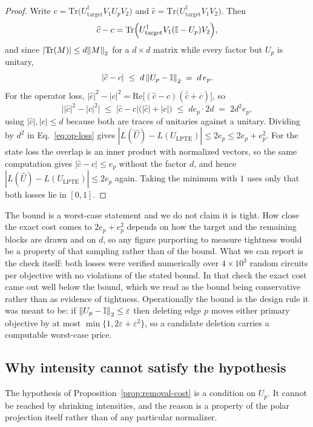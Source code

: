 \documentclass[twocolumn,aps,prl,superscriptaddress,showkeys]{revtex4-2}
\theoremstyle{plain}
\theoremstyle{definition}
\begin{document}
\begin{proof}
Write $c=\mathrm{Tr}\bigl(U_{\mathrm{target}}^\dagger V_1U_pV_2\bigr)$ and $\widehat c=\mathrm{Tr}\bigl(U_{\mathrm{target}}^\dagger V_1V_2\bigr)$. Then
$$\widehat c-c=\mathrm{Tr}\Bigl(U_{\mathrm{target}}^\dagger V_1(\mathbb{I}-U_p)V_2\Bigr),$$
and since $|\mathrm{Tr}(M)|\le d\norm{M}_2$ for a $d\times d$ matrix while every factor but $U_p$ is unitary,
$$|\widehat c-c|\;\le\;d\,\norm{U_p-\mathbb{I}}_2\;=\;d\,e_p .$$
For the operator loss, $|\widehat c|^2-|c|^2=\mathrm{Re}\bigl[(\widehat c-c)(\overline{\widehat c}+\overline c)\bigr]$, so
$$\bigl||\widehat c|^2-|c|^2\bigr|\;\le\;|\widehat c-c|\bigl(|\widehat c|+|c|\bigr)\;\le\;d e_p\cdot 2d\;=\;2d^2e_p ,$$
using $|\widehat c|,|c|\le d$ because both are traces of unitaries against a unitary. Dividing by $d^2$ in Eq.~\eqref{eq:op-loss} gives $|L(\widehat U)-L(U_{\mathrm{LPTE}})|\le 2e_p\le 2e_p+e_p^2$. For the state loss the overlap is an inner product with normalized vectors, so the same computation gives $|\widehat c-c|\le e_p$ without the factor $d$, and hence $|L(\widehat U)-L(U_{\mathrm{LPTE}})|\le 2e_p$ again. Taking the minimum with $1$ uses only that both losses lie in $[0,1]$.
\end{proof}

The bound is a worst-case statement and we do not claim it is tight. How close the exact cost comes to $2e_p+e_p^2$ depends on how the target and the remaining blocks are drawn and on $d$, so any figure purporting to measure tightness would be a property of that sampling rather than of the bound. What we can report is the check itself: both losses were verified numerically over $4\times10^3$ random circuits per objective with no violations of the stated bound. In that check the exact cost came out well below the bound, which we read as the bound being conservative rather than as evidence of tightness. Operationally the bound is the design rule it was meant to be: if $\norm{U_p-\mathbb{I}}_2\le\varepsilon$ then deleting edge $p$ moves either primary objective by at most $\min\{1,2\varepsilon+\varepsilon^2\}$, so a candidate deletion carries a computable worst-case price.

\subsection{Why intensity cannot satisfy the hypothesis}

The hypothesis of Proposition~\ref{prop:removal-cost} is a condition on $U_p$. It cannot be reached by shrinking intensities, and the reason is a property of the polar projection itself rather than of any particular normalizer.
\end{document}
